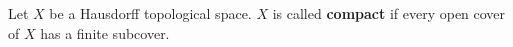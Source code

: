 Let $X$ be a Hausdorff topological space. $X$ is called \textbf{compact} if every open cover of $X$ has a finite subcover.
